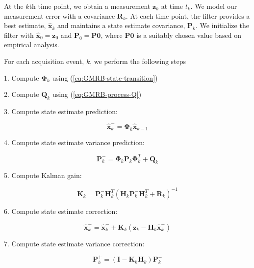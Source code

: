\documentclass[12pt]{article}
\begin{document}
At the $k$th time point, we obtain a measurement $\mathbf{z}_k$ at time $t_k$. We model
our measurement error with a covariance $\mathbf{R}_k$. At each time point, the filter
provides a best estimate, $\hat{\mathbf{x}}_k$ and maintains a state estimate covariance,
$\mathbf{P}_k$. We initialize the filter with $\hat{\mathbf{x}}_0 = \mathbf{z}_0$ and
$\mathbf{P}_0 = \mathbf{P0}$, where $\mathbf{P0}$ is a suitably chosen value based on empirical
analysis.

For each acquisition event, $k$, we perform the following steps

1. Compute $\mathbf{\Phi}_k$ using (\ref{eq:GMRB-state-transition})

2. Compute $\mathbf{Q}_k$ using (\ref{eq:GMRB-process-Q})

3. Compute state estimate prediction:

\begin{equation}
    \hat{\mathbf{x}}_k^- = \mathbf{\Phi}_k \hat{\mathbf{x}}_{k-1}
    \label{eq:GMRB-KF-x-prediction}
\end{equation}

4. Compute state estimate variance prediction:

\begin{equation}
    \mathbf{P}_k^- = \mathbf{\Phi}_k \mathbf{P}_k \mathbf{\Phi}_k^T + \mathbf{Q}_k
    \label{eq:GMRB-KF-P-prediction}
\end{equation}

5. Compute Kalman gain:

\begin{equation}
    \mathbf{K}_k = \mathbf{P}_k^- \mathbf{H}_k^T
        \left (
            \mathbf{H}_k \mathbf{P}_k^- \mathbf{H}_k^T + \mathbf{R}_k
        \right )^{-1}
    \label{eq:GMRB-KF-gain}
\end{equation}

6. Compute state estimate correction:

\begin{equation}
    \hat{\mathbf{x}}_k^+ = \hat{\mathbf{x}}_k^- + \mathbf{K}_k
    \left (
        \mathbf{z}_k - \mathbf{H}_k \hat{\mathbf{x}}_k^-
    \right )
    \label{eq:GMRB-KF-x-correction}
\end{equation}

7. Compute state estimate variance correction:

\begin{equation}
    \mathbf{P}_k^+ = \left ( \mathbf{I} - \mathbf{K}_k \mathbf{H}_k \right ) \mathbf{P}_k^-
    \label{eq:GMRB-KF-P-correction}
\end{equation}
\end{document}
